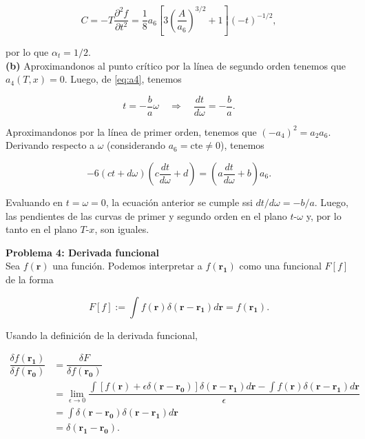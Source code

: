 \documentclass[10pt]{article}
\begin{document}
\begin{equation}
C = -T \dfrac{\partial^2 f}{\partial t^2} = \dfrac{1}{8} a_6\left[3 \left( \dfrac{A}{a_6}\right)^{3/2} + 1\right] (-t)^{-1/2},
\end{equation}

por lo que $\alpha_t = 1/2$.\\

\textbf{(b)} Aproximandonos al punto cr\'itico por la l\'inea de segundo orden tenemos que $a_4(T, x) = 0$. Luego, de \ref{eq:a4}, tenemos 

\begin{equation}
t = -\dfrac{b}{a} \omega \quad \Rightarrow \quad \dfrac{dt}{d\omega} = -\dfrac{b}{a}.
\end{equation}

Aproximandonos por la l\'inea de primer orden, tenemos que $(-a_4)^2 = a_2 a_6$. Derivando respecto a $\omega$ (considerando $a_6 = \text{cte} \neq 0$), tenemos

\begin{equation}
-6 \left( ct + d\omega \right) \left( c \dfrac{dt}{d\omega} + d \right) = \left(a\dfrac{dt}{d\omega} + b \right) a_6.
\end{equation}

Evaluando en $t = \omega = 0$, la ecuaci\'on anterior se cumple ssi $dt/d\omega = -b/a$. Luego, las pendientes de las curvas de primer y segundo orden en el plano $t\text{-}\omega$ y, por lo tanto en el plano $T\text{-}x$, son iguales.


\pagebreak

\textbf{Problema 4: Derivada funcional}\\

Sea $f(\mathbf{r})$ una funci\'on. Podemos interpretar a $f(\mathbf{r_1})$ como una funcional $F[f]$ de la forma

\begin{equation}
F[f] := \int f(\mathbf{r}) \delta(\mathbf{r} - \mathbf{r_1}) d \mathbf{r} = f(\mathbf{r_1}).
\end{equation}

Usando la definici\'on de la derivada funcional,

\begin{align*}
\dfrac{\delta f(\mathbf{r_1})}{\delta f(\mathbf{r_0})} &= \dfrac{\delta F}{\delta f(\mathbf{r_0})} \\
&= \lim_{\epsilon\rightarrow 0} \dfrac{\int \left[ f(\mathbf{r}) + \epsilon \delta(\mathbf{r} - \mathbf{r_0})\right] \delta(\mathbf{r} - \mathbf{r_1}) d \mathbf{r} - \int f(\mathbf{r}) \delta(\mathbf{r} - \mathbf{r_1}) d \mathbf{r}}{\epsilon} \\
&= \int \delta(\mathbf{r} - \mathbf{r_0}) \delta(\mathbf{r} - \mathbf{r_1}) d \mathbf{r} \\
&=  \delta(\mathbf{r_1} - \mathbf{r_0}).
\end{align*}
\end{document}
